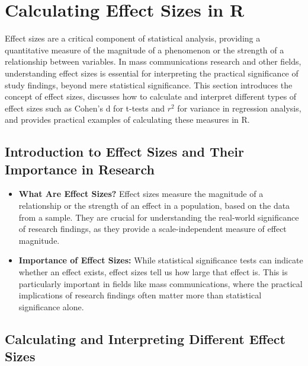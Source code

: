 \documentclass[
]{book}
\begin{document}
\section{Calculating Effect Sizes in R}\label{calculating-effect-sizes-in-r}

Effect sizes are a critical component of statistical analysis, providing a quantitative measure of the magnitude of a phenomenon or the strength of a relationship between variables. In mass communications research and other fields, understanding effect sizes is essential for interpreting the practical significance of study findings, beyond mere statistical significance. This section introduces the concept of effect sizes, discusses how to calculate and interpret different types of effect sizes such as Cohen's d for t-tests and \(r^2\) for variance in regression analysis, and provides practical examples of calculating these measures in R.

\subsection*{Introduction to Effect Sizes and Their Importance in Research}\label{introduction-to-effect-sizes-and-their-importance-in-research}

\begin{itemize}
\item
  \textbf{What Are Effect Sizes?} Effect sizes measure the magnitude of a relationship or the strength of an effect in a population, based on the data from a sample. They are crucial for understanding the real-world significance of research findings, as they provide a scale-independent measure of effect magnitude.
\item
  \textbf{Importance of Effect Sizes:} While statistical significance tests can indicate whether an effect exists, effect sizes tell us how large that effect is. This is particularly important in fields like mass communications, where the practical implications of research findings often matter more than statistical significance alone.
\end{itemize}

\subsection*{Calculating and Interpreting Different Effect Sizes}\label{calculating-and-interpreting-different-effect-sizes}
\end{document}
